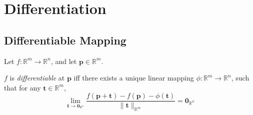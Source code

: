 
\chapter{Differentiation}


\section{Differentiable Mapping}


\begin{definition}
	\label{def: differentiable}
	Let $f: \mathbb R^m \to \mathbb R^n$, and let $\mathbf p \in \mathbb R^m$.
	

	$f$ is \textit{differentiable} at $\mathbf p$ iff there exists a unique linear mapping $\phi: \mathbb R^m \to \mathbb R^n$, such that for any $\mathbf t \in \mathbb R^m$,
	$$
	\lim_{\mathbf t \to \mathbf 0_{\mathbb R^n}} \frac{f(\mathbf p + \mathbf t) - f(\mathbf p) - \phi(\mathbf t)}{\| \mathbf t \|_{\mathbb R^m}} = \mathbf 0_{\mathbb R^n}
	$$
\end{definition}


